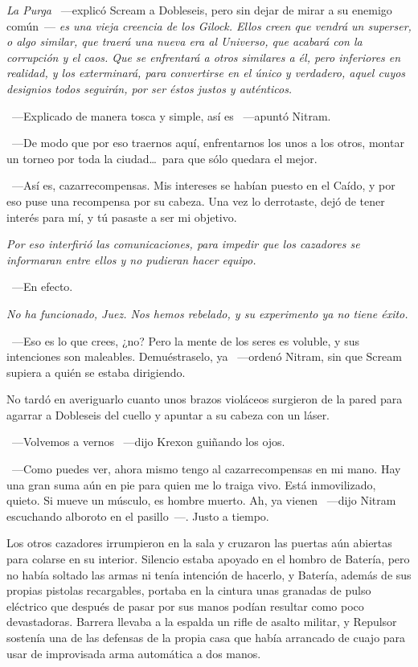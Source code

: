 \emph{La Purga} ~---explicó Scream a Dobleseis, pero sin dejar de mirar a su enemigo común~--- \emph{es una vieja creencia de los Gilock. Ellos creen que vendrá un superser, o algo similar, que traerá una nueva era al Universo, que acabará con la corrupción y el caos. Que se enfrentará a otros similares a él, pero inferiores en realidad, y los exterminará, para convertirse en el único y verdadero, aquel cuyos designios todos seguirán, por ser éstos justos y auténticos.}

~---Explicado de manera tosca y simple, así es ~---apuntó Nitram.

~---De modo que por eso traernos aquí, enfrentarnos los unos a los otros, montar un torneo por toda la ciudad\dots\ para que sólo quedara el mejor.

~---Así es, cazarrecompensas. Mis intereses se habían puesto en el Caído, y por eso puse una recompensa por su cabeza. Una vez lo derrotaste, dejó de tener interés para mí, y tú pasaste a ser mi objetivo.

\emph{Por eso interfirió las comunicaciones, para impedir que los cazadores se informaran entre ellos y no pudieran hacer equipo.}

~---En efecto.

\emph{No ha funcionado, Juez. Nos hemos rebelado, y su experimento ya no tiene éxito.}

~---Eso es lo que crees, ¿no? Pero la mente de los seres es voluble, y sus intenciones son maleables. Demuéstraselo, ya ~---ordenó Nitram, sin que Scream supiera a quién se estaba dirigiendo.

No tardó en averiguarlo cuanto unos brazos violáceos surgieron de la pared para agarrar a Dobleseis del cuello y apuntar a su cabeza con un láser.

~---Volvemos a vernos ~---dijo Krexon guiñando los ojos.

~---Como puedes ver, ahora mismo tengo al cazarrecompensas en mi mano. Hay una gran suma aún en pie para quien me lo traiga vivo. Está inmovilizado, quieto. Si mueve un músculo, es hombre muerto. Ah, ya vienen ~---dijo Nitram escuchando alboroto en el pasillo~---. Justo a tiempo.

Los otros cazadores irrumpieron en la sala y cruzaron las puertas aún abiertas para colarse en su interior. Silencio estaba apoyado en el hombro de Batería, pero no había soltado las armas ni tenía intención de hacerlo, y Batería, además de sus propias pistolas recargables, portaba en la cintura unas granadas de pulso eléctrico que después de pasar por sus manos podían resultar como poco devastadoras. Barrera llevaba a la espalda un rifle de asalto militar, y Repulsor sostenía una de las defensas de la propia casa que había arrancado de cuajo para usar de improvisada arma automática a dos manos.


